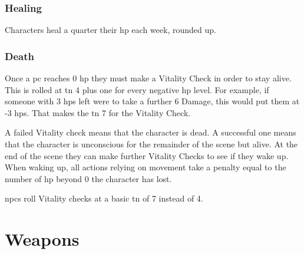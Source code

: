 \begin{multicols}{2}
\subsubsection{Healing}
Characters heal a quarter their \gls{hp} each week, rounded up.

\subsubsection{Death}
Once a \gls{pc} reaches 0 \gls{hp} they must make a Vitality Check in order to stay alive.
This is rolled at \gls{tn} 4 plus one for every negative \gls{hp} level.\iftoggle{verbose}{\footnote{Traits such as Strength do not affect the Vitality check because in a way, they already have.
Stronger characters already have more \gls{hp}, which has already kept them farther from death.}}{}
For example, if someone with 3 \glspl{hp} left were to take a further 6 Damage, this would put them at -3 \glspl{hp}.
That makes the \gls{tn} 7 for the Vitality Check.

A failed Vitality check means that the character is dead.
A successful one means that the character is unconscious for the remainder of the scene but alive.
At the end of the scene they can make further Vitality Checks to see if they wake up.
When waking up, all actions relying on movement take a penalty equal to the number of \gls{hp} beyond 0 the character has lost.

\glspl{npc} roll Vitality checks at a basic \gls{tn} of 7 instead of 4.


\end{multicols}

\section{Weapons}

